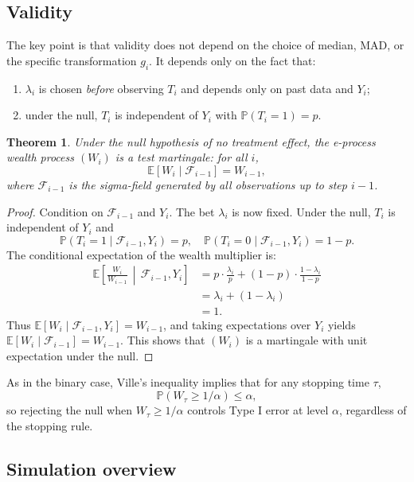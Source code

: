 \documentclass[10pt]{article}
\newtheorem{theorem}{Theorem}
\begin{document}
\subsection{Validity}

The key point is that validity does not depend on the choice of median, MAD, or the specific transformation $g_i$. It depends only on the fact that:
\begin{enumerate}
    \item $\lambda_i$ is chosen \emph{before} observing $T_i$ and depends only on past data and $Y_i$;
    \item under the null, $T_i$ is independent of $Y_i$ with $\mathbb{P}(T_i = 1) = p$.
\end{enumerate}

\begin{theorem}
Under the null hypothesis of no treatment effect, the e-process wealth process $(W_i)$ is a test martingale: for all $i$,
\[
\mathbb{E}[W_i \mid \mathcal{F}_{i-1}] = W_{i-1},
\]
where $\mathcal{F}_{i-1}$ is the sigma-field generated by all observations up to step $i-1$.
\end{theorem}

\begin{proof}
Condition on $\mathcal{F}_{i-1}$ and $Y_i$. The bet $\lambda_i$ is now fixed. Under the null, $T_i$ is independent of $Y_i$ and
\[
\mathbb{P}(T_i = 1 \mid \mathcal{F}_{i-1}, Y_i) = p, \quad
\mathbb{P}(T_i = 0 \mid \mathcal{F}_{i-1}, Y_i) = 1-p.
\]
The conditional expectation of the wealth multiplier is:
\begin{align}
\mathbb{E}\!\left[\frac{W_i}{W_{i-1}} \,\middle|\, \mathcal{F}_{i-1}, Y_i\right]
&= p \cdot \frac{\lambda_i}{p} + (1-p) \cdot \frac{1 - \lambda_i}{1-p} \\
&= \lambda_i + (1 - \lambda_i) \\
&= 1.
\end{align}
Thus $\mathbb{E}[W_i \mid \mathcal{F}_{i-1}, Y_i] = W_{i-1}$, and taking expectations over $Y_i$ yields $\mathbb{E}[W_i \mid \mathcal{F}_{i-1}] = W_{i-1}$. This shows that $(W_i)$ is a martingale with unit expectation under the null.
\end{proof}

As in the binary case, Ville's inequality implies that for any stopping time $\tau$,
\[
\mathbb{P}(W_\tau \geq 1/\alpha) \leq \alpha,
\]
so rejecting the null when $W_\tau \geq 1/\alpha$ controls Type I error at level $\alpha$, regardless of the stopping rule.

\subsection{Simulation overview}
\end{document}
